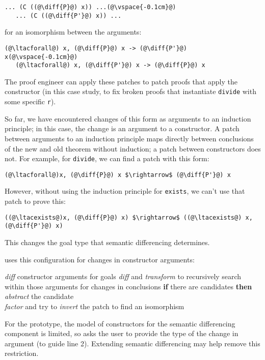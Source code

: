 \begin{lstlisting}[language=coq]
   ... (C ((@\diff{P}@) x)) ...(@\vspace{-0.1cm}@)
   ... (C ((@\diff{P'}@) x)) ...
\end{lstlisting}
for an isomorphism between the arguments:

\begin{lstlisting}[language=coq]
   (@\ltacforall@) x, (@\diff{P}@) x -> (@\diff{P'}@) x(@\vspace{-0.1cm}@)
   (@\ltacforall@) x, (@\diff{P'}@) x -> (@\diff{P}@) x
\end{lstlisting}
The proof engineer can apply these patches to patch proofs that apply the constructor (in this case study,
to fix broken proofs that instantiate \lstinline{divide} with some specific \lstinline{r}).

So far, we have encountered changes of this form as arguments to an 
induction principle; in this case, the change is an argument to a constructor.
A patch between arguments to an induction principle maps
directly between conclusions of the new and old theorem without
induction; a patch between constructors does not.
For example, for \lstinline{divide}, we can find a patch with this form:

\begin{lstlisting}[language=coq]
   (@\ltacforall@)x, (@\diff{P}@) x $\rightarrow$ (@\diff{P'}@) x
\end{lstlisting}
However, without using the induction principle for \lstinline{exists}, we can't use that patch to prove this:

\begin{lstlisting}[language=coq]
   ((@\ltacexists@)x, (@\diff{P}@) x) $\rightarrow$ ((@\ltacexists@) x, (@\diff{P'}@) x)
\end{lstlisting}
This changes the goal type that semantic differencing determines.

\sysname uses this configuration for changes in constructor arguments:

\begin{algorithm}
\footnotesize
\begin{algorithmic}[1]
    \STATE \textit{diff} constructor arguments for goals
    \STATE \textit{diff} and \textit{transform} to recursively search within those arguments for changes in conclusions
    \STATE \textbf{if} there are candidates \textbf{then}
    \STATE \hspace*{1em} \textit{abstract} the candidate \\
           \hspace*{1em} \textit{factor} and try to \textit{invert} the patch to find an isomorphism
\end{algorithmic}
\end{algorithm}
For the prototype, the model of constructors for the semantic differencing component is limited,
so \sysname asks the user to provide the type of the change in argument (to guide line 2).
Extending semantic differencing may help remove this restriction.




